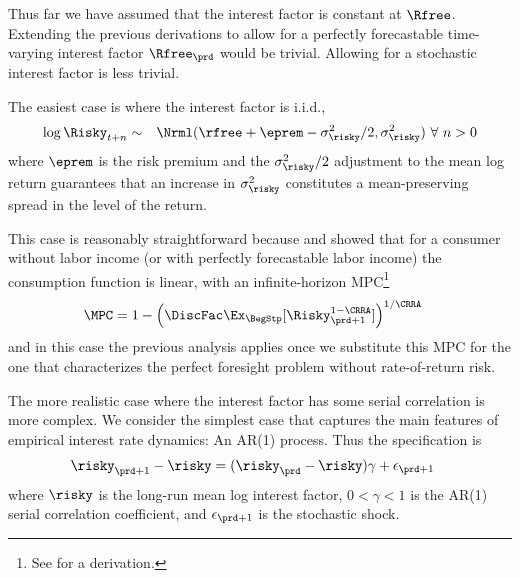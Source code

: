Thus far we have assumed that the interest factor is constant at $\Rfree$.  Extending the
previous derivations to allow for a perfectly forecastable time-varying interest factor $\Rfree_{\prd}$
would be trivial.  Allowing for a stochastic interest factor is less trivial.


The easiest case is where the interest factor is i.i.d.,
  \begin{equation}\begin{gathered}\begin{aligned}
        \log \Risky_{t+n} & \sim & \Nrml(\rfree + \eprem - \sigma^{2}_{\risky}/2,\sigma^{2}_{\risky}) ~\forall~n>0 \label{eq:distRisky}
      \end{aligned}\end{gathered}\end{equation}
where $\eprem$ is the risk premium and the $\sigma^{2}_{\risky}/2$ adjustment to the mean log return
guarantees that an increase in $\sigma^{2}_{\risky}$ constitutes a mean-preserving spread in the level of the return.

This case is reasonably straightforward because \cite{merton:restat} and \cite{samuelson:portfolio} showed
that for a consumer without labor income (or with perfectly forecastable labor income) the consumption
function is linear, with an infinite-horizon MPC\footnote{See  for a derivation.}
\begin{equation}\begin{gathered}\begin{aligned}
      \MPC  & = 1- \left(\DiscFac  \Ex_{\BegStp}[\Risky_{\prd+1}^{1-\CRRA}]\right)^{1/\CRRA} \label{eq:MPCExact}
    \end{aligned}\end{gathered}\end{equation}
and in this case the previous analysis applies once we substitute this MPC for the one that characterizes
the perfect foresight problem without rate-of-return risk.

The more realistic case where the interest factor has some serial correlation is more complex.  We consider
the simplest case that captures the main features of empirical interest rate dynamics: An AR(1) process.  Thus
the specification is
\begin{equation}\begin{gathered}\begin{aligned}
      \risky_{\prd+1}-\risky  & = (\risky_{\prd}-\risky) \gamma + \epsilon_{\prd+1}
    \end{aligned}\end{gathered}\end{equation}
where $\risky$ is the long-run mean log interest factor, $0 < \gamma < 1$ is the AR(1) serial correlation
coefficient, and $\epsilon_{\prd+1}$ is the stochastic shock.


